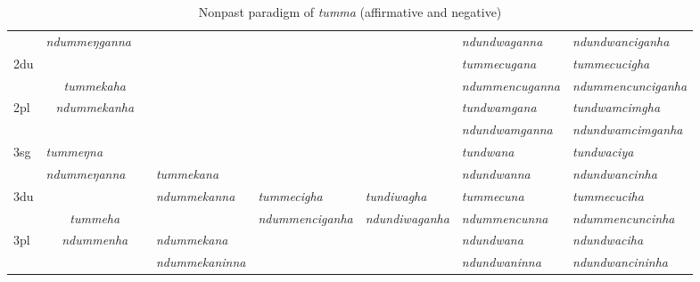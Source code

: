\begin{landscape}
\begin{table}[p]
{{\begin{tabular}{|l||p{2.4cm}|p{2.0cm}|p{2.6cm}|p{2.8cm}|p{2.6cm}|p{3.2cm}|p{3.2cm}|}
		&  \emph{ndummeŋganna} &  & \multicolumn{3}{c|}{ \cellcolor[gray]{.8}}&\emph{ ndundwaganna} &\emph{ndundwanciganha}  \\
 \cline{1-2} \cline{7-8}			
{\sc 2du}		&	\multicolumn{2}{c|}{}     & \multicolumn{3}{c|}{\cellcolor[gray]{.8}} & \emph{tummecugana}  &  \emph{tummecucigha} \\
		&  	\multicolumn{2}{c|}{\emph{tummekaha}} & \multicolumn{3}{c|}{\cellcolor[gray]{.8} }&\emph{ndummencuganna}  & \emph{ndummencunciganha} \\
 \cline{1-1} \cline{7-8}			
{\sc 2pl}		&	\multicolumn{2}{c|}{\emph{ndummekanha}} & \multicolumn{3}{c|}{ \cellcolor[gray]{.8}}& \emph{tundwamgana}& \emph{tundwamcimgha}  \\
		&	\multicolumn{2}{c|}{ }& \multicolumn{3}{c|}{\cellcolor[gray]{.8}}&\emph{ ndundwamganna} & \emph{ndundwamcimganha} \\
\hline			
{\sc 3sg} 		&\emph{tummeŋna}	  &	      	&  			&    &    	&\emph{tundwana}&\emph{tundwaciya}\\
		& \emph{ndummeŋanna}   &   	& \emph{tummekana}	&  &   &\emph{ndundwanna}&\emph{ndundwancinha}\\
  \cline{1-2}  \cline{7-8}					
{\sc 3du}& \multicolumn{2}{c|}{}&\emph{ndummekanna}& \emph{tummecigha}&\emph{tundiwagha}&  \emph{tummecuna} & \emph{ tummecuciha}\\
	& \multicolumn{2}{c|}{\emph{tummeha}}& &\emph{ndummenciganha}& \emph{ndundiwaganha} & \emph{ndummencunna} & \emph{ndummencuncinha}\\
 \cline{1-1} \cline{4-4} \cline{7-8}	
{\sc 3pl}&\multicolumn{2}{c|}{\emph{ndummenha}}	&\emph{ndummekana}& & &\emph{ndundwana}&\emph{ndundwaciha}\\	
	&\multicolumn{2}{c|}{ }&\emph{ndummekaninna}&& &\emph{ndundwaninna}&\emph{ndundwancininha} \\
\hline
\end{tabular}
}
}
\caption{Nonpast paradigm of \emph{tumma}  (affirmative and negative)}\label{par-tund-npst}
\end{table}




\end{landscape}
